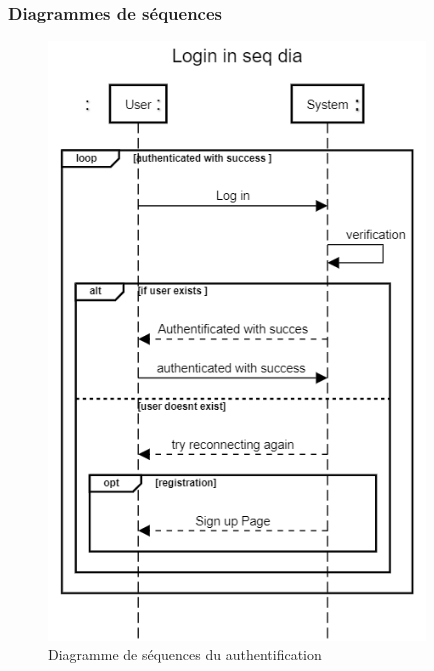 \documentclass[french, a4paper, french]{report}
\begin{document}
		\subsubsection{Diagrammes de séquences}
			\begin{figure}[!h]
  				\center
  				\includegraphics[width=10cm]{seqlogin.png}
  				\caption{Diagramme de séquences du authentification}
  				\label{fig:seqlogin}
			\end{figure}
\end{document}
